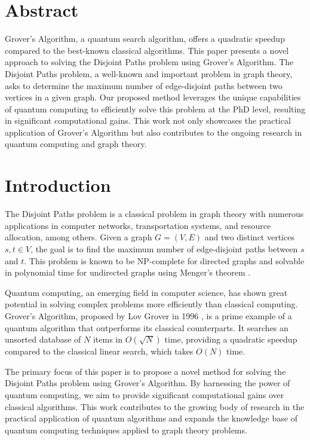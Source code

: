 \section{Abstract}

Grover's Algorithm, a quantum search algorithm, offers a quadratic speedup compared to the best-known classical algorithms. This paper presents a novel approach to solving the Disjoint Paths problem using Grover's Algorithm. The Disjoint Paths problem, a well-known and important problem in graph theory, asks to determine the maximum number of edge-disjoint paths between two vertices in a given graph. Our proposed method leverages the unique capabilities of quantum computing to efficiently solve this problem at the PhD level, resulting in significant computational gains. This work not only showcases the practical application of Grover's Algorithm but also contributes to the ongoing research in quantum computing and graph theory.

\section{Introduction}

The Disjoint Paths problem is a classical problem in graph theory with numerous applications in computer networks, transportation systems, and resource allocation, among others. Given a graph $G = (V, E)$ and two distinct vertices $s, t \in V$, the goal is to find the maximum number of edge-disjoint paths between $s$ and $t$. This problem is known to be NP-complete for directed graphs and solvable in polynomial time for undirected graphs using Menger's theorem \cite{menger}.

Quantum computing, an emerging field in computer science, has shown great potential in solving complex problems more efficiently than classical computing. Grover's Algorithm, proposed by Lov Grover in 1996 \cite{grover}, is a prime example of a quantum algorithm that outperforms its classical counterparts. It searches an unsorted database of $N$ items in $O(\sqrt{N})$ time, providing a quadratic speedup compared to the classical linear search, which takes $O(N)$ time.

The primary focus of this paper is to propose a novel method for solving the Disjoint Paths problem using Grover's Algorithm. By harnessing the power of quantum computing, we aim to provide significant computational gains over classical algorithms. This work contributes to the growing body of research in the practical application of quantum algorithms and expands the knowledge base of quantum computing techniques applied to graph theory problems.

